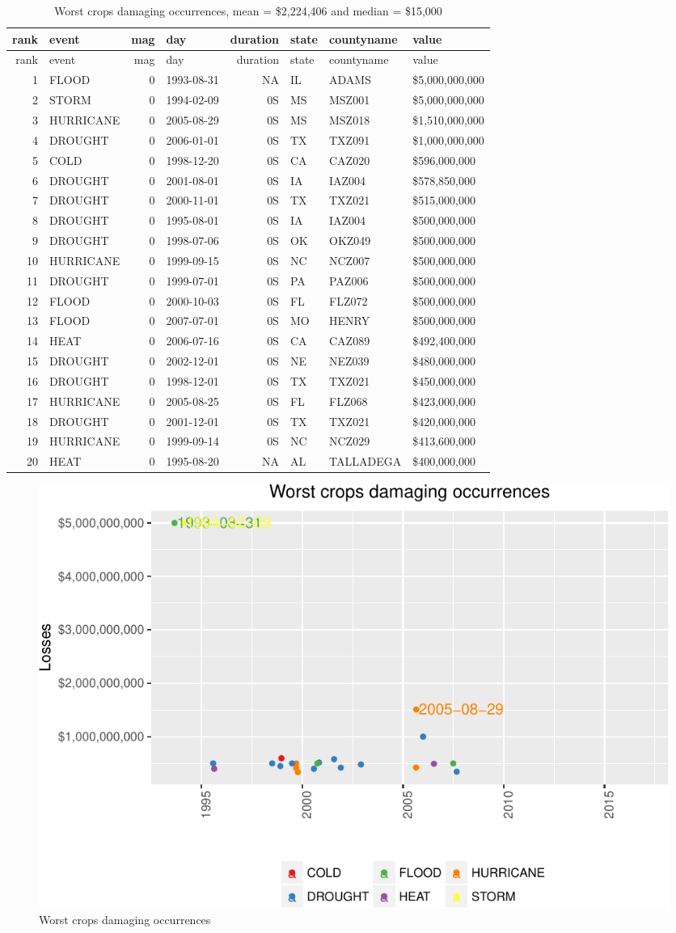 \documentclass[]{article}
\begin{document}
\begin{longtable}[]{@{}rlrlrlll@{}}
\caption{Worst crops damaging occurrences, mean = \$2,224,406 and median
= \$15,000}\tabularnewline
\toprule
rank & event & mag & day & duration & state & countyname &
value\tabularnewline
\midrule
\endfirsthead
\toprule
rank & event & mag & day & duration & state & countyname &
value\tabularnewline
\midrule
\endhead
1 & FLOOD & 0 & 1993-08-31 & NA & IL & ADAMS &
\$5,000,000,000\tabularnewline
2 & STORM & 0 & 1994-02-09 & 0S & MS & MSZ001 &
\$5,000,000,000\tabularnewline
3 & HURRICANE & 0 & 2005-08-29 & 0S & MS & MSZ018 &
\$1,510,000,000\tabularnewline
4 & DROUGHT & 0 & 2006-01-01 & 0S & TX & TXZ091 &
\$1,000,000,000\tabularnewline
5 & COLD & 0 & 1998-12-20 & 0S & CA & CAZ020 &
\$596,000,000\tabularnewline
6 & DROUGHT & 0 & 2001-08-01 & 0S & IA & IAZ004 &
\$578,850,000\tabularnewline
7 & DROUGHT & 0 & 2000-11-01 & 0S & TX & TXZ021 &
\$515,000,000\tabularnewline
8 & DROUGHT & 0 & 1995-08-01 & 0S & IA & IAZ004 &
\$500,000,000\tabularnewline
9 & DROUGHT & 0 & 1998-07-06 & 0S & OK & OKZ049 &
\$500,000,000\tabularnewline
10 & HURRICANE & 0 & 1999-09-15 & 0S & NC & NCZ007 &
\$500,000,000\tabularnewline
11 & DROUGHT & 0 & 1999-07-01 & 0S & PA & PAZ006 &
\$500,000,000\tabularnewline
12 & FLOOD & 0 & 2000-10-03 & 0S & FL & FLZ072 &
\$500,000,000\tabularnewline
13 & FLOOD & 0 & 2007-07-01 & 0S & MO & HENRY &
\$500,000,000\tabularnewline
14 & HEAT & 0 & 2006-07-16 & 0S & CA & CAZ089 &
\$492,400,000\tabularnewline
15 & DROUGHT & 0 & 2002-12-01 & 0S & NE & NEZ039 &
\$480,000,000\tabularnewline
16 & DROUGHT & 0 & 1998-12-01 & 0S & TX & TXZ021 &
\$450,000,000\tabularnewline
17 & HURRICANE & 0 & 2005-08-25 & 0S & FL & FLZ068 &
\$423,000,000\tabularnewline
18 & DROUGHT & 0 & 2001-12-01 & 0S & TX & TXZ021 &
\$420,000,000\tabularnewline
19 & HURRICANE & 0 & 1999-09-14 & 0S & NC & NCZ029 &
\$413,600,000\tabularnewline
20 & HEAT & 0 & 1995-08-20 & NA & AL & TALLADEGA &
\$400,000,000\tabularnewline
\bottomrule
\end{longtable}

\begin{figure}[htbp]
\centering
\includegraphics{readme_files/figure-latex/crop-single-plot-1.pdf}
\caption{Worst crops damaging occurrences}
\end{figure}
\end{document}
